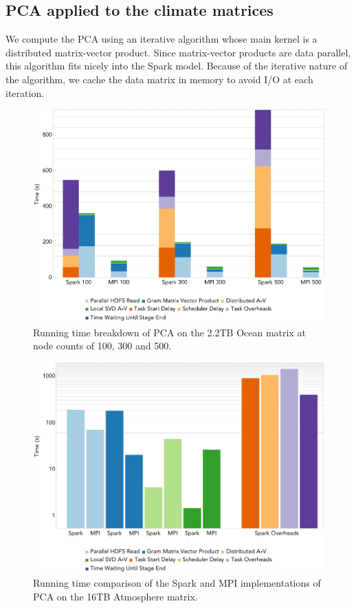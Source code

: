 \subsection{PCA applied to the climate matrices}

We compute the PCA using an iterative algorithm whose main kernel is a distributed matrix-vector product. Since matrix-vector products are data parallel, this algorithm fits nicely into the Spark model. Because of the iterative nature of the algorithm, we cache the data matrix in memory to avoid I/O at each iteration.

\begin{figure}[th!]
\centering
\includegraphics[width=.9\textwidth]{fig/ocean_pca_times.png}
\caption{Running time breakdown of PCA on the 2.2TB Ocean matrix at node counts of 100, 300 and 500.}
\label{fig:pcart}
\end{figure}

\begin{figure}[th!]
\centering
\includegraphics[width=.9\textwidth]{fig/hero_pca_times.png}
\caption{Running time comparison of the Spark and MPI implementations of PCA on the 16TB Atmosphere matrix.}
\label{fig:hero}
\end{figure}

